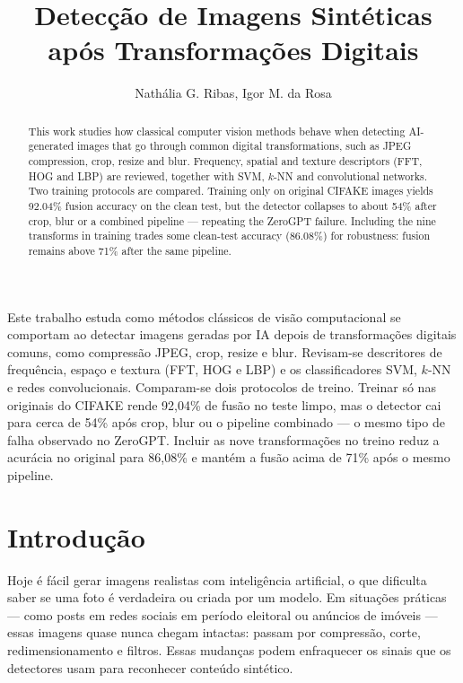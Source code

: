 \documentclass[12pt]{article}
\title{Detecção de Imagens Sintéticas após Transformações Digitais}
\author{Nathália G. Ribas\inst{1}, Igor M. da Rosa\inst{1}}
\begin{document}
\maketitle

\begin{abstract}
This work studies how classical computer vision methods behave when detecting AI-generated images that go through common digital transformations, such as JPEG compression, crop, resize and blur. Frequency, spatial and texture descriptors (FFT, HOG and LBP) are reviewed, together with SVM, $k$-NN and convolutional networks. Two training protocols are compared. Training only on original CIFAKE images yields 92.04\% fusion accuracy on the clean test, but the detector collapses to about 54\% after crop, blur or a combined pipeline --- repeating the ZeroGPT failure. Including the nine transforms in training trades some clean-test accuracy (86.08\%) for robustness: fusion remains above 71\% after the same pipeline.
\end{abstract}

\begin{resumo}
Este trabalho estuda como métodos clássicos de visão computacional se comportam ao detectar imagens geradas por IA depois de transformações digitais comuns, como compressão JPEG, crop, resize e blur. Revisam-se descritores de frequência, espaço e textura (FFT, HOG e LBP) e os classificadores SVM, $k$-NN e redes convolucionais. Comparam-se dois protocolos de treino. Treinar só nas originais do CIFAKE rende 92,04\% de fusão no teste limpo, mas o detector cai para cerca de 54\% após crop, blur ou o pipeline combinado --- o mesmo tipo de falha observado no ZeroGPT. Incluir as nove transformações no treino reduz a acurácia no original para 86,08\% e mantém a fusão acima de 71\% após o mesmo pipeline.
\end{resumo}

\section{Introdução}

Hoje é fácil gerar imagens realistas com inteligência artificial, o que dificulta saber se uma foto é verdadeira ou criada por um modelo. Em situações práticas --- como posts em redes sociais em período eleitoral ou anúncios de imóveis --- essas imagens quase nunca chegam intactas: passam por compressão, corte, redimensionamento e filtros. Essas mudanças podem enfraquecer os sinais que os detectores usam para reconhecer conteúdo sintético.
\end{document}

